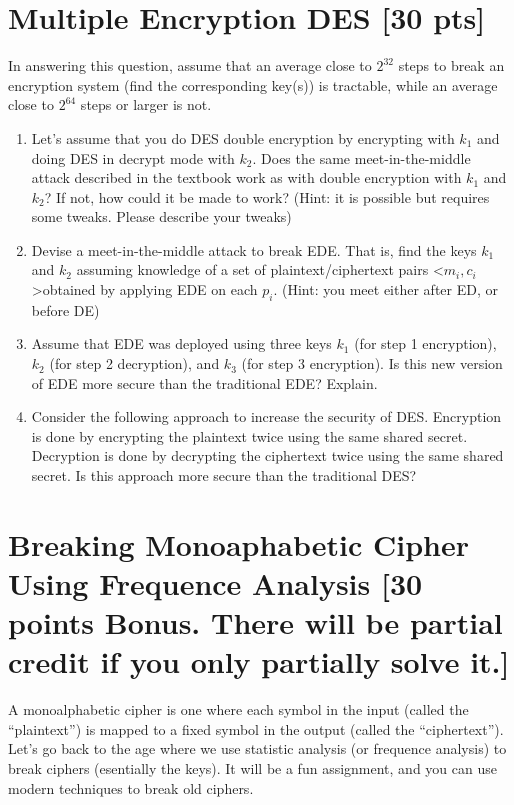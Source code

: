 \documentclass[11pt]{article}
\begin{document}
\vspace{1in}

\section{Multiple Encryption DES [30 pts]}
In answering this question, assume that an average close to $2^{32}$ steps to break an encryption system (find the corresponding key(s)) is tractable, while an average close to $2^{64}$ steps or larger is not. 

\begin{enumerate}
\item Let's assume that you do DES double encryption by encrypting with $k_1$ and doing DES in decrypt mode with $k_2$. Does the same meet-in-the-middle attack described in the textbook work as with double encryption with $k_1$ and $k_2$? If not, how could it be made to work? (Hint: it is possible but requires some tweaks. Please describe your tweaks)

\item Devise a meet-in-the-middle attack to break EDE. That is, find the keys $k_1$ and $k_2$ assuming knowledge of a set of plaintext/ciphertext pairs \textless$m_i, c_i$\textgreater obtained by applying EDE on each $p_i$.  (Hint: you meet either after ED, or before DE)

\item Assume that EDE was deployed using three keys $k_1$ (for step 1 encryption), $k_2$ (for step 2 decryption), and $k_3$ (for step 3 encryption). Is this new version of EDE more secure than the traditional EDE? Explain.

\item Consider the following approach to increase the security of DES. Encryption is done by encrypting the plaintext twice using the same shared secret. Decryption is done by decrypting the ciphertext twice using the same shared secret. Is this approach more secure than the traditional DES?
\end{enumerate}
\vspace{1in}



\section{Breaking Monoaphabetic Cipher Using Frequence Analysis [30 points Bonus. There will be partial credit if you only partially solve it.]}

A monoalphabetic cipher is one where each symbol in the input (called the ``plaintext'') is mapped to a fixed symbol in the output (called the ``ciphertext''). Let's go back to the age where we use statistic analysis (or frequence analysis) to break ciphers (esentially the keys).  It will be a fun assignment, and you can use modern techniques to break old ciphers.
\end{document}
